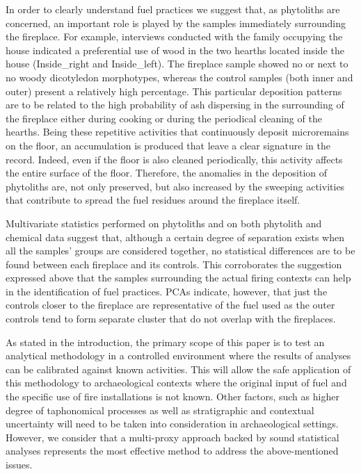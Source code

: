 \documentclass[authoryear,preprint,review,12pt]{elsarticle}
\begin{document}
In order to clearly understand fuel practices we suggest that, as phytoliths are concerned, an important role is played by the samples immediately surrounding the fireplace. For example, interviews conducted with the family occupying the house indicated a preferential use of wood in the two hearths located inside the house (Inside\_right and Inside\_left). The fireplace sample showed no or next to no woody dicotyledon morphotypes, whereas the control samples (both inner and outer) present a relatively high percentage. This particular deposition patterns are to be related to the high probability of ash dispersing in the surrounding of the fireplace either during cooking or during the periodical cleaning of the hearths. Being these repetitive activities that continuously deposit microremains on the floor, an accumulation is produced that leave a clear signature in the record. Indeed, even if the floor is also cleaned periodically, this activity affects the entire surface of the floor. Therefore, the anomalies in the deposition of phytoliths are, not only preserved, but also increased by the sweeping activities that contribute to spread the fuel residues around the fireplace itself.\par
Multivariate statistics performed on phytoliths and on both phytolith and chemical data suggest that, although a certain degree of separation exists when all the samples' groups are considered together, no statistical differences are to be found between each fireplace and its controls. This corroborates the suggestion expressed above that the samples surrounding the actual firing contexts can help in the identification of fuel practices. PCAs indicate, however, that just the controls closer to the fireplace are representative of the fuel used as the outer controls tend to form separate cluster that do not overlap with the fireplaces.\par
As stated in the introduction, the primary scope of this paper is to test an analytical methodology in a controlled environment where the results of analyses can be calibrated against known activities. This will allow the safe application of this methodology to archaeological contexts where the original input of fuel and the specific use of fire installations is not known. Other factors, such as higher degree of taphonomical processes as well as stratigraphic and contextual uncertainty will need to be taken into consideration in archaeological settings. However, we consider that a multi-proxy approach backed by sound statistical analyses represents the most effective method to address the above-mentioned issues.
\end{document}
